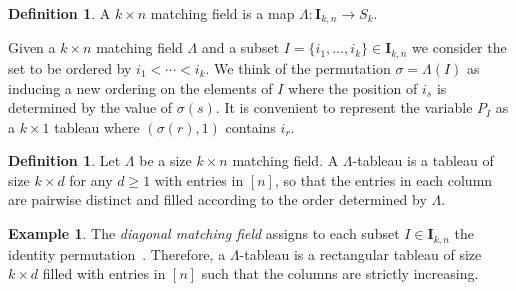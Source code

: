 \documentclass[10pt]{amsart}
\theoremstyle{definition}
\newtheorem{Definition}[theo]{Definition}
\newtheorem{exam}[theo]{Example}
\begin{document}
\begin{Definition}\label{def:matching}
A $k\times n$ matching field is a map $\Lambda: \mathbf{I}_{k,n} \to S_k$.
\end{Definition}

Given a $k\times n$ matching field $\Lambda$ and a subset $I = \{i_1, \ldots , i_k\} \in \mathbf{I}_{k, n}$ 
we consider the set to be ordered by $i_1 < \cdots < i_{k}$. We think of the permutation {$\sigma=\Lambda(I)$} as inducing a new ordering on the elements of $I$ 
where the position of $i_s$ is determined by the value of $\sigma(s)$.
It is convenient to represent the variable $P_I$ as a $k \times 1$ tableau 
 where $(\sigma(r), 1)$ contains $i_{r}$.

\begin{Definition}
Let $\Lambda$ be a size $k \times n$ matching field. 
A $\Lambda$-tableau is a tableau of size $k \times d$ for any $d\geq 1$ with entries in $[n]$,
so that the entries in each column are pairwise distinct and filled according to the order determined by $\Lambda$. 
\end{Definition}


\begin{exam}\label{ex:diagonal1}
The \emph{diagonal matching field} assigns to
each subset $I \in \mathbf{I}_{k,n}$ the identity permutation~\cite[Example~1.3]{sturmfels1993maximal}.
Therefore, a $\Lambda$-tableau is a rectangular tableau of size $k \times d$ filled with entries in $[n]$ such that the columns are strictly increasing. 
\end{exam}
\end{document}

